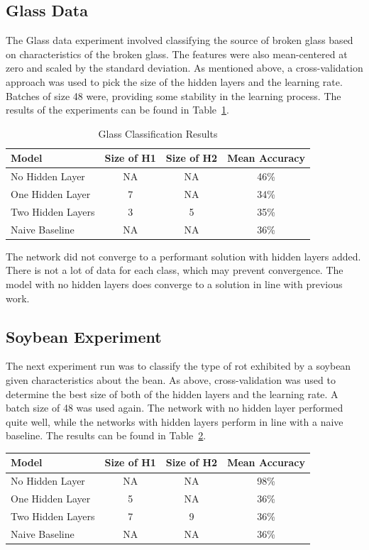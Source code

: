 \documentclass{amsart}
\begin{document}
    \subsection*{Glass Data}
    The Glass data\cite{glassdataset} experiment involved classifying the source of
    broken glass based on characteristics of the broken glass.
    The features were also mean-centered at zero and scaled by the standard deviation.
    As mentioned above, a cross-validation approach was used to pick the size of the hidden layers and
    the learning rate. Batches of size 48 were, providing some stability in the learning process.
    The results of the experiments can be found in Table~\ref{glass_results}.
    \begin{table}[H]
    \begin{tabular}{lccc}
    Model & Size of H1 & Size of H2 & Mean Accuracy \\
    \hline
    No Hidden Layer & NA & NA & 46\%\\
    One Hidden Layer & 7 & NA & 34\% \\
    Two Hidden Layers & 3 & 5 & 35\% \\
    Naive Baseline & NA & NA & 36\%
    \end{tabular}
    \label{glass_results}
    \caption{Glass Classification Results}
    \end{table}
    The network did not converge to a performant solution with hidden layers added.
    There is not a lot of data for each class, which may prevent convergence. The
    model with no hidden layers does converge to a solution in line with
    previous work.


    \subsection*{Soybean Experiment}
    The next experiment run was to classify the type of rot exhibited by a soybean given
    characteristics about the bean\cite{soybeandataset}. As above, cross-validation was used to determine the best
    size of both of the hidden layers and the learning rate. A batch size of 48 was used again.
    The network with no hidden layer performed quite well, while the networks with hidden layers
    perform in line with a naive baseline. The results can be found in Table~\ref{soybean_results}.
    \begin{table}[H]
    \begin{tabular}{lccc}
    Model & Size of H1 & Size of H2 & Mean Accuracy \\
    \hline
    No Hidden Layer & NA & NA & 98\%  \\
    One Hidden Layer & 5 & NA & 36\% \\
    Two Hidden Layers & 7 & 9 & 36\% \\
    Naive Baseline & NA & NA & 36\%
    \end{tabular}
    \label{soybean_results}
    \end{table}
\end{document}

